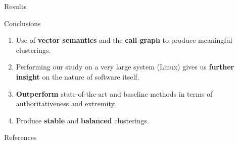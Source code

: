 \documentclass[final]{beamer}
\newlength{\sepwidth}
\newlength{\colwidth}
\newcommand{\separatorcolumn}{\begin{column}{\sepwidth}\end{column}}
\begin{document}
\begin{frame}[t]
\begin{columns}[t]
\begin{column}{\colwidth}
\begin{block}{Results}
  \end{block}

	\begin{alertblock}{Conclusions}
	\begin{enumerate}
	\justifying
    \item Use of \textbf{vector semantics} and the \textbf{call graph} to produce meaningful clusterings.
    \item Performing our study on a very large system (Linux) gives us \textbf{further insight} on the nature of software itself.
    \item \textbf{Outperform} state-of-the-art and baseline methods in terms of authoritativeness and extremity.
    \item Produce \textbf{stable} and \textbf{balanced} clusterings. 
\end{enumerate}

	
		
	\end{alertblock}


  \begin{block}{References}
	
    \scriptsize{}

  \end{block}

\end{column}

\separatorcolumn
\end{columns}
\end{frame}
\end{document}
